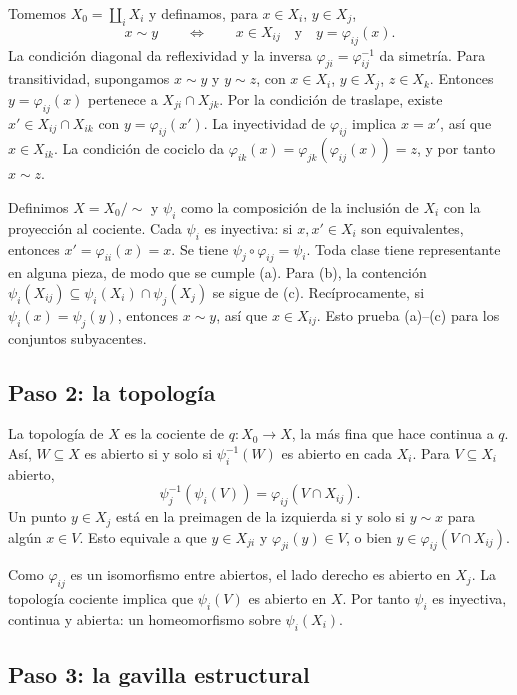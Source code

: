 Tomemos $X_0=\coprod_iX_i$ y definamos, para $x\in X_i$, $y\in X_j$,
\[
x\sim y\qquad\Longleftrightarrow\qquad x\in X_{ij}\quad\text{y}\quad y=\varphi_{ij}(x).
\]
La condición diagonal da reflexividad y la inversa $\varphi_{ji}=\varphi_{ij}^{-1}$ da simetría. Para transitividad, supongamos $x\sim y$ y $y\sim z$, con $x\in X_i$, $y\in X_j$, $z\in X_k$. Entonces $y=\varphi_{ij}(x)$ pertenece a $X_{ji}\cap X_{jk}$. Por la condición de traslape, existe $x'\in X_{ij}\cap X_{ik}$ con $y=\varphi_{ij}(x')$. La inyectividad de $\varphi_{ij}$ implica $x=x'$, así que $x\in X_{ik}$. La condición de cociclo da $\varphi_{ik}(x)=\varphi_{jk}(\varphi_{ij}(x))=z$, y por tanto $x\sim z$.

Definimos $X=X_0/\sim$ y $\psi_i$ como la composición de la inclusión de $X_i$ con la proyección al cociente. Cada $\psi_i$ es inyectiva: si $x,x'\in X_i$ son equivalentes, entonces $x'=\varphi_{ii}(x)=x$. Se tiene $\psi_j\circ\varphi_{ij}=\psi_i$. Toda clase tiene representante en alguna pieza, de modo que se cumple (a). Para (b), la contención $\psi_i(X_{ij})\subseteq\psi_i(X_i)\cap\psi_j(X_j)$ se sigue de (c). Recíprocamente, si $\psi_i(x)=\psi_j(y)$, entonces $x\sim y$, así que $x\in X_{ij}$. Esto prueba (a)--(c) para los conjuntos subyacentes.

\subsection{Paso 2: la topología}
\label{sec:s07-paso-2}

La topología de $X$ es la cociente de $q\colon X_0\to X$, la más fina que hace continua a $q$. Así, $W\subseteq X$ es abierto si y solo si $\psi_i^{-1}(W)$ es abierto en cada $X_i$. Para $V\subseteq X_i$ abierto,
\[
\psi_j^{-1}(\psi_i(V))=\varphi_{ij}(V\cap X_{ij}).
\]
Un punto $y\in X_j$ está en la preimagen de la izquierda si y solo si $y\sim x$ para algún $x\in V$. Esto equivale a que $y\in X_{ji}$ y $\varphi_{ji}(y)\in V$, o bien $y\in\varphi_{ij}(V\cap X_{ij})$.

Como $\varphi_{ij}$ es un isomorfismo entre abiertos, el lado derecho es abierto en $X_j$. La topología cociente implica que $\psi_i(V)$ es abierto en $X$. Por tanto $\psi_i$ es inyectiva, continua y abierta: un homeomorfismo sobre $\psi_i(X_i)$.

\subsection{Paso 3: la gavilla estructural}
\label{sec:s07-paso-3}

